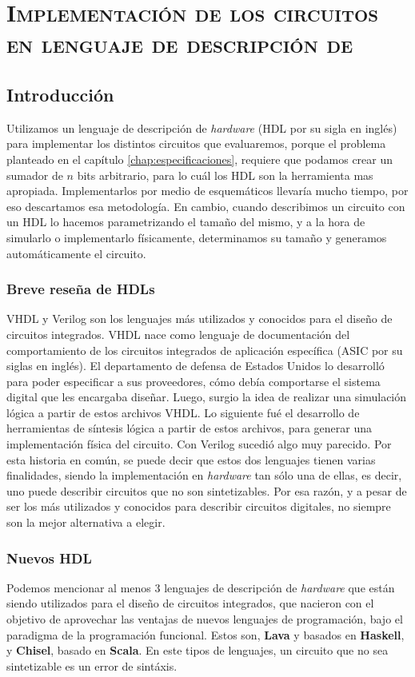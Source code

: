 \chapter{\textsc{Implementación de los circuitos en lenguaje de descripción de } }\label{implementaciónHDL}
\section{Introducción}
Utilizamos un lenguaje de descripción de \emph{hardware} (HDL por su sigla en inglés) para implementar los distintos circuitos que evaluaremos, porque el problema planteado en el capítulo \ref{chap:especificaciones}, requiere que podamos crear un sumador de $n$ bits arbitrario, para lo cuál los HDL son la herramienta mas apropiada. Implementarlos por medio de esquemáticos llevaría mucho tiempo, por eso descartamos esa metodología. En cambio, cuando describimos un circuito con un HDL lo hacemos parametrizando el tamaño del mismo, y a la hora de simularlo o implementarlo físicamente, determinamos su tamaño y generamos automáticamente el circuito. 

\subsection{Breve reseña de HDLs}
VHDL y Verilog son los lenguajes más utilizados y conocidos para el diseño de circuitos integrados. VHDL nace como lenguaje de documentación del comportamiento de los circuitos integrados de aplicación específica (ASIC por su siglas en inglés). El departamento de defensa de Estados Unidos lo desarrolló para poder especificar a sus proveedores, cómo debía comportarse el sistema digital que les encargaba diseñar. Luego, surgio la idea de realizar una simulación lógica a partir de estos archivos VHDL. Lo siguiente fué el desarrollo de herramientas de síntesis lógica a partir de estos archivos, para generar una implementación física del circuito. Con Verilog sucedió algo muy parecido. Por esta historia en común, se puede decir que estos dos lenguajes tienen varias finalidades, siendo la implementación en \emph{hardware} tan sólo una de ellas, es decir, uno puede describir circuitos que no son sintetizables. Por esa razón, y a pesar de ser los más utilizados y conocidos para describir circuitos digitales, no siempre son la mejor alternativa a elegir.

\subsection{Nuevos HDL}\label{subsec:nuevosHDL}
Podemos mencionar al menos 3 lenguajes de descripción de \emph{hardware} que están siendo utilizados para el diseño de circuitos integrados, que nacieron con el objetivo de aprovechar las ventajas de nuevos lenguajes de programación, bajo el paradigma de la programación funcional. Estos son, \textbf{Lava}\cite{Lava} y \cite{Clash} basados en \textbf{Haskell}, y \textbf{Chisel}\cite{Chisel}, basado en \textbf{Scala}. En este tipos de lenguajes, un circuito que no sea sintetizable es un error de sintáxis. 

